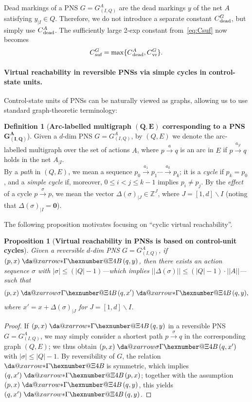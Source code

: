 \documentclass[11pt,a4paper]{amsart}
\makeatletter
\newcommand{\step}[1]{\mathrel{\xrightarrow{#1}}}
\newcommand{\virtual}[1]{\mathrel{\xdashrightarrow{#1}}\hspace{-0.3em}}
\newcommand{\vreach}{\virtual{*}}
\newcommand{\nnorm}[1]{||#1||}
\newcommand{\vr}{{}_\textnormal{vr}}
\newcommand{\dead}{{}_\textnormal{dead}}
\newcommand{\suf}{{}_\textnormal{suf}}
\newcommand{\Zset}{\mathbb{Z}}
\newcommand{\restr}[1]{_{|{#1}}}
\newcommand{\setZ}{\Zset}
\newcommand*{\da@rightarrow}{\mathchar"0\hexnumber@\symAMSa 4B }
\newcommand*{\xdashrightarrow}[2][]{%
  \mathrel{%
    \mathpalette{\da@xarrow{#1}{#2}{}\da@rightarrow{\,}{}}{}%
  }%
}
\newcommand*{\da@xarrow}[7]{%
  \sbox0{$\ifx#7\scriptstyle\scriptscriptstyle\else\scriptstyle\fi#5#1#6\m@th$}%
  \sbox2{$\ifx#7\scriptstyle\scriptscriptstyle\else\scriptstyle\fi#5#2#6\m@th$}%
  \sbox4{$#7\dabar@\m@th$}%
  \dimen@=\wd0 %
  \ifdim\wd2 >\dimen@
    \dimen@=\wd2 %
  \fi
  \count@=2 %
  \def\da@bars{\dabar@\dabar@}%
  \@whiledim\count@\wd4<\dimen@\do{%
    \advance\count@\@ne
    \expandafter\def\expandafter\da@bars\expandafter{%
      \da@bars
      \dabar@ 
    }%
  }%
  \mathrel{#3}%
  \mathrel{%
    \mathop{\da@bars}\limits
    \ifx\\#1\\%
    \else
      _{\copy0}%
    \fi
    \ifx\\#2\\%
    \else
      ^{\copy2}%
    \fi
  }%
  \mathrel{#4}%
}
\theoremstyle{plain}
\newtheorem{prop}[thm]{Proposition}
\theoremstyle{definition}
\newtheorem{defi}[thm]{Definition}
\theoremstyle{defC}
\theoremstyle{thmC}
\makeatother
\begin{document}
\noindent
Dead markings of a PNS $G=G_{(I,Q)}^A$ are the dead markings $y$ of the
net $A$ satisfying $y\restr{I}\in Q$. Therefore, we do not introduce
a separate constant
$C\dead^G$, but simply use $C\dead^A$.  The sufficiently large 2-exp
constant from~\eqref{eq:Csuf} now becomes
\begin{equation}\label{eq:CsufG}
C\suf^G=\max\{C\dead^A,C\vr^G\}.
\end{equation}

\paragraph{Virtual reachability in reversible PNSs via simple cycles
in control-state units.}
Control-state units of PNSs can be naturally viewed as graphs, allowing us
to use standard graph-theoretic terminology:

\begin{defi}[\textbf{Arc-labelled multigraph $\bm{(Q,E)}$ corresponding to
	a PNS $\bm{G_{(I,Q)}^A}$}]
	Given a $d$-dim PNS $G=G_{(I,Q)}^A$, by $(Q,E)$ we denote 
the arc-labelled multigraph 
over the set of actions $A$, 	where 
$p\step{a}q$ is an arc in $E$ if $p\step{a\restr{I}}q$ holds in
the net $A\restr{I}$.
\\
By a \emph{path} in $(Q,E)$, we mean a sequence
	$p_0\step{a_1}p_1\cdots \step{a_k}p_k$; it is a \emph{cycle}
	if $p_k=p_0$, and a \emph{simple
cycle} if, moreover, $0\leq i<j\leq k-1$ implies $p_i\neq p_j$. 
By the
\emph{effect} of a cycle $p\step{\sigma}p$, we mean
	the vector $\Delta(\sigma)\restr{J}\in\setZ^J$, where
	$J=[1,d]\smallsetminus I$
(noting that $\Delta(\sigma)\restr{I}=\mathbf{0}$).
\end{defi}	

\noindent
The following proposition motivates  focusing on
 ``cyclic virtual reachability''.

\begin{prop}[\textbf{Virtual reachability in PNSs is based on
	control-unit cycles}]\label{prop:quickreachcycle}
Given a reversible $d$-dim PNS $G=G_{(I,Q)}^A$, if $(p,x)\vreach (q,y)$, then
there exists an action sequence $\sigma$ with $|\sigma|\leq
	(|Q|-1)$---which implies $\nnorm{\Delta(\sigma)}\leq
	(|Q|-1)\cdot\nnorm{A}$---such that
	\[(p,x)\virtual{\sigma}(q,x')\vreach(q,y),\]
where $x'=x+\Delta(\sigma)\restr{J}$ for $J=[1,d]\smallsetminus I$.
\end{prop}
\begin{proof}
If $(p,x)\vreach (q,y)$ in a reversible PNS $G=G_{(I,Q)}^A$,
we may simply consider a
	shortest path $p\step{\sigma}q$ in the corresponding graph $(Q,E)$;
we thus obtain $(p,x)\virtual{\sigma}(q,x')$ with
	$|\sigma|\leq |Q|-1$.
By reversibility of $G$, the relation $\vreach$ is symmetric, which
	implies  $(q,x')\vreach(p,x)$; together with the assumption $(p,x) \vreach
(q,y)$, this yields $(q,x') \vreach (q,y)$. 
\end{proof}
\end{document}
